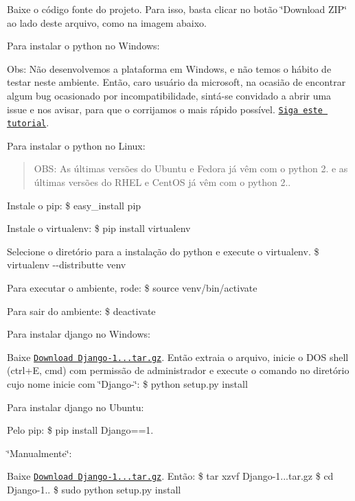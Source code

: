 \begin{DoxyEnumerate}
\item Baixe o código fonte do projeto. Para isso, basta clicar no botão \char`\"{}\-Download Z\-I\-P\char`\"{} ao lado deste arquivo, como na imagem abaixo. 
\item Para instalar o python no Windows\-:

Obs\-: Não desenvolvemos a plataforma em Windows, e não temos o hábito de testar neste ambiente. Então, caro usuário da microsoft, na ocasião de encontrar algum bug ocasionado por incompatibilidade, sintá-\/se convidado a abrir uma issue e nos avisar, para que o corrijamos o mais rápido possível. \href{http://docs.python-guide.org/en/latest/starting/install/win/}{\tt Siga este tutorial}.
\item Para instalar o python no Linux\-: \begin{quotation}
O\-B\-S\-: As últimas versões do Ubuntu e Fedora já vêm com o python 2. e as últimas versões do R\-H\-E\-L e Cent\-O\-S já vêm com o python 2..

\end{quotation}

\begin{DoxyItemize}
\item Instale o pip\-: {\ttfamily \$ easy\-\_\-install pip}
\item Instale o virtualenv\-: {\ttfamily \$ pip install virtualenv}
\item Selecione o diretório para a instalação do python e execute o virtualenv. {\ttfamily \$ virtualenv -\/-\/distributte venv}
\item Para executar o ambiente, rode\-: {\ttfamily \$ source venv/bin/activate}
\item Para sair do ambiente\-: {\ttfamily \$ deactivate}
\end{DoxyItemize}
\item Para instalar django no Windows\-:
\begin{DoxyItemize}
\item Baixe \href{https://www.djangoproject.com/download/1.7.1/tarball/}{\tt Download Django-\/1...\-tar.\-gz}. Então extraia o arquivo, inicie o D\-O\-S shell (ctrl+\-E, cmd) com permissão de administrador e execute o comando no diretório cujo nome inicie com \char`\"{}\-Django-\/\char`\"{}\-: {\ttfamily \$ python setup.\-py install}
\end{DoxyItemize}
\item Para instalar django no Ubuntu\-:
\begin{DoxyItemize}
\item Pelo pip\-: {\ttfamily \$ pip install Django==1.}
\item \char`\"{}\-Manualmente\char`\"{}\-:
\begin{DoxyItemize}
\item Baixe \href{https://www.djangoproject.com/download/1.7.1/tarball/}{\tt Download Django-\/1...\-tar.\-gz}. Então\-: {\ttfamily \$ tar xzvf Django-\/1...\-tar.\-gz} {\ttfamily \$ cd Django-\/1..} {\ttfamily \$ sudo python setup.\-py install} 
\end{DoxyItemize}
\end{DoxyItemize}
\end{DoxyEnumerate}